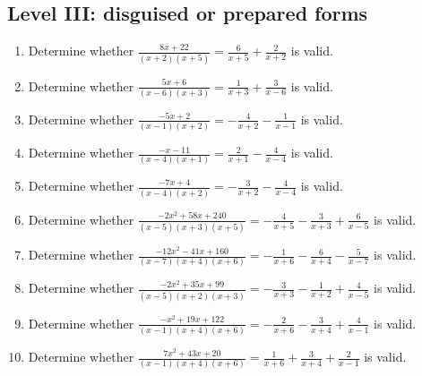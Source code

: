 \documentclass[11pt,oneside]{book}
\begin{document}
\subsection*{Level III: disguised or prepared forms}
\begin{enumerate}[leftmargin=*,label=\textbf{\arabic*.},itemsep=0.65\baselineskip]
\item Determine whether $\displaystyle \frac{8 x + 22}{\left(x + 2\right) \left(x + 5\right)}=\frac{6}{x + 5} + \frac{2}{x + 2}$ is valid.
\item Determine whether $\displaystyle \frac{5 x + 6}{\left(x - 6\right) \left(x + 3\right)}=\frac{1}{x + 3} + \frac{3}{x - 6}$ is valid.
\item Determine whether $\displaystyle \frac{- 5 x + 2}{\left(x - 1\right) \left(x + 2\right)}=- \frac{4}{x + 2} - \frac{1}{x - 1}$ is valid.
\item Determine whether $\displaystyle \frac{- x - 11}{\left(x - 4\right) \left(x + 1\right)}=\frac{2}{x + 1} - \frac{4}{x - 4}$ is valid.
\item Determine whether $\displaystyle \frac{- 7 x + 4}{\left(x - 4\right) \left(x + 2\right)}=- \frac{3}{x + 2} - \frac{4}{x - 4}$ is valid.
\item Determine whether $\displaystyle \frac{- 2 x^{2} + 58 x + 240}{\left(x - 5\right) \left(x + 3\right) \left(x + 5\right)}=- \frac{4}{x + 5} - \frac{3}{x + 3} + \frac{6}{x - 5}$ is valid.
\item Determine whether $\displaystyle \frac{- 12 x^{2} - 41 x + 160}{\left(x - 7\right) \left(x + 4\right) \left(x + 6\right)}=- \frac{1}{x + 6} - \frac{6}{x + 4} - \frac{5}{x - 7}$ is valid.
\item Determine whether $\displaystyle \frac{- 2 x^{2} + 35 x + 99}{\left(x - 5\right) \left(x + 2\right) \left(x + 3\right)}=- \frac{3}{x + 3} - \frac{1}{x + 2} + \frac{4}{x - 5}$ is valid.
\item Determine whether $\displaystyle \frac{- x^{2} + 19 x + 122}{\left(x - 1\right) \left(x + 4\right) \left(x + 6\right)}=- \frac{2}{x + 6} - \frac{3}{x + 4} + \frac{4}{x - 1}$ is valid.
\item Determine whether $\displaystyle \frac{7 x^{2} + 43 x + 20}{\left(x - 1\right) \left(x + 4\right) \left(x + 6\right)}=\frac{1}{x + 6} + \frac{3}{x + 4} + \frac{2}{x - 1}$ is valid.
\end{enumerate}
\end{document}
